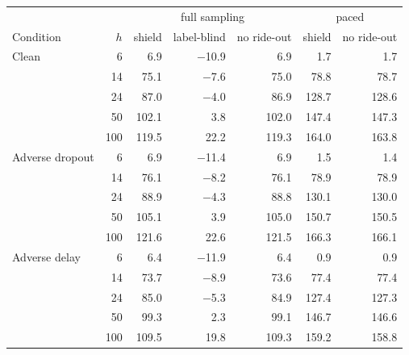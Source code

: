 \begin{tabular}{@{}l r rrr rr@{}}
\toprule
 & & \multicolumn{3}{c}{full sampling} & \multicolumn{2}{c}{paced} \\
Condition & $h$ & shield & label-blind & no ride-out & shield & no ride-out \\
\midrule
Clean & 6 & 6.9 & $-$10.9 & 6.9 & 1.7 & 1.7 \\
 & 14 & 75.1 & $-$7.6 & 75.0 & 78.8 & 78.7 \\
 & 24 & 87.0 & $-$4.0 & 86.9 & 128.7 & 128.6 \\
 & 50 & 102.1 & 3.8 & 102.0 & 147.4 & 147.3 \\
 & 100 & 119.5 & 22.2 & 119.3 & 164.0 & 163.8 \\
\midrule
Adverse dropout & 6 & 6.9 & $-$11.4 & 6.9 & 1.5 & 1.4 \\
 & 14 & 76.1 & $-$8.2 & 76.1 & 78.9 & 78.9 \\
 & 24 & 88.9 & $-$4.3 & 88.8 & 130.1 & 130.0 \\
 & 50 & 105.1 & 3.9 & 105.0 & 150.7 & 150.5 \\
 & 100 & 121.6 & 22.6 & 121.5 & 166.3 & 166.1 \\
\midrule
Adverse delay & 6 & 6.4 & $-$11.9 & 6.4 & 0.9 & 0.9 \\
 & 14 & 73.7 & $-$8.9 & 73.6 & 77.4 & 77.4 \\
 & 24 & 85.0 & $-$5.3 & 84.9 & 127.4 & 127.3 \\
 & 50 & 99.3 & 2.3 & 99.1 & 146.7 & 146.6 \\
 & 100 & 109.5 & 19.8 & 109.3 & 159.2 & 158.8 \\
\bottomrule
\end{tabular}
